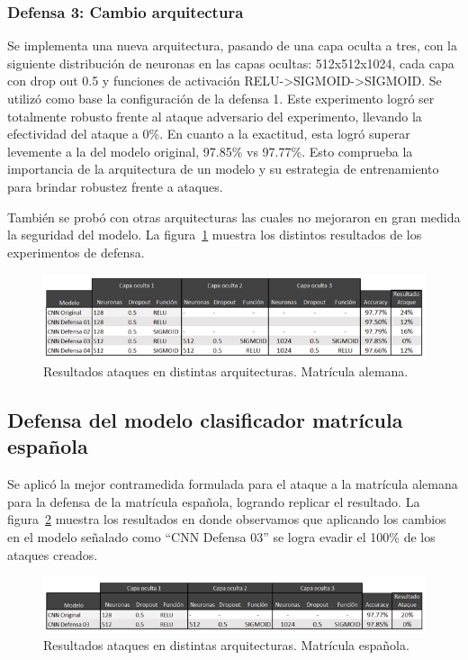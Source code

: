 \subsubsection{Defensa 3: Cambio arquitectura}

Se implementa una nueva arquitectura, pasando de una capa oculta a tres, con la siguiente distribución de neuronas en las capas ocultas: 512x512x1024, cada capa con drop out 0.5 y funciones de activación RELU->SIGMOID->SIGMOID. Se utilizó como base la configuración de la defensa 1. Este experimento logró ser totalmente robusto frente al ataque adversario del experimento, llevando la efectividad del ataque a 0\%. En cuanto a la exactitud, esta logró superar levemente a la del modelo original, 97.85\% vs 97.77\%. Esto comprueba la importancia de la arquitectura de un modelo y su estrategia de entrenamiento para brindar robustez frente a ataques.

También se probó con otras arquitecturas las cuales no mejoraron en gran medida la seguridad del modelo. La figura~\ref{fig:65} muestra los distintos resultados de los experimentos de defensa.

 \begin{figure}[!h]
    \centering
    \includegraphics[scale = 0.85]{Figures/figura_65.PNG}
    \decoRule
    \caption[Resultados ataques en distintas arquitecturas. Matrícula alemana]{Resultados ataques en distintas arquitecturas. Matrícula alemana.}
    \label{fig:65}
\end{figure}




\subsection{Defensa del modelo clasificador matrícula española}

Se aplicó la mejor contramedida formulada para el ataque a la matrícula alemana para la defensa de la matrícula española, logrando replicar el resultado. La figura~\ref{fig:66} muestra los resultados en donde observamos que aplicando los cambios en el modelo señalado como “CNN Defensa 03” se logra evadir el 100\% de los ataques creados.
\begin{figure}[!h]
    \centering
    \includegraphics[scale = 0.85]{Figures/figura_66.PNG}
    \decoRule
    \caption[Resultados ataques en distintas arquitecturas. Matrícula española]{Resultados ataques en distintas arquitecturas. Matrícula española.}
    \label{fig:66}
\end{figure}